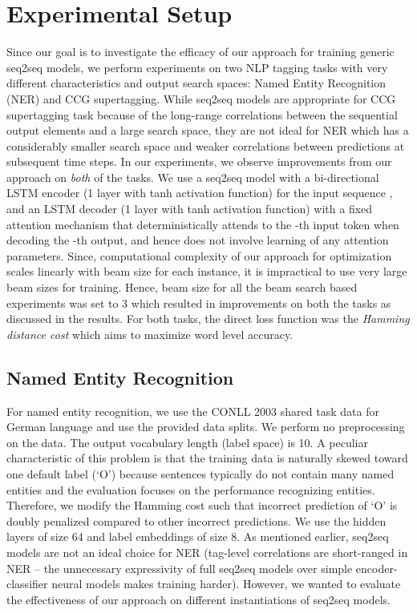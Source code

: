 \documentclass[letterpaper]{article} \usepackage{aaai18}  \usepackage{times}  \usepackage{helvet}  \usepackage{courier}  \usepackage{url}  \usepackage{graphicx}  \frenchspacing
\begin{document}
\section{Experimental Setup}
Since our goal is to investigate the efficacy of our approach for training generic seq2seq models, we perform experiments on two NLP tagging tasks with very different characteristics and output search spaces: Named Entity Recognition (NER) and CCG supertagging. While seq2seq models are appropriate for CCG supertagging task because of the long-range correlations between the sequential output elements and a large search space, they are not ideal for NER which has a considerably smaller search space and weaker correlations between predictions at subsequent time steps. In our experiments, we observe improvements from our approach on \emph{both} of the tasks.  
We use a seq2seq model with a bi-directional LSTM encoder (1 layer with tanh activation function) for the input sequence , and an LSTM decoder (1 layer with tanh activation function) with a fixed attention mechanism that deterministically attends to the -th input token when decoding the -th output, and hence does not involve learning of any attention parameters. Since, computational complexity of our approach for optimization scales linearly with beam size for each instance, it is impractical to use very large beam sizes for training. Hence, beam size for all the beam search based experiments was set to 3 which resulted in improvements on both the tasks as discussed in the results. For both tasks, the direct loss function was the \textit{Hamming distance cost} which aims to maximize word level accuracy.
\subsection{Named Entity Recognition}
For named entity recognition, we use the CONLL 2003 shared task data \cite{tjong2003introduction} for German language and use the provided data splits. We perform no preprocessing on the data. The output vocabulary length (label space) is 10. A peculiar characteristic of this problem is that the training data is naturally skewed toward one default label (`O') because sentences typically do not contain many named entities and the evaluation focuses on the performance recognizing entities. Therefore, we modify the Hamming cost such that incorrect prediction of `O' is doubly penalized compared to other incorrect predictions. We use the hidden layers of size 64 and label embeddings of size 8. As mentioned earlier, seq2seq models are not an ideal choice for NER (tag-level correlations are short-ranged in NER -- the unnecessary expressivity of full seq2seq models over simple encoder-classifier neural models makes training harder). However, we wanted to evaluate the effectiveness of our approach on different instantiations of seq2seq models.
\end{document}
